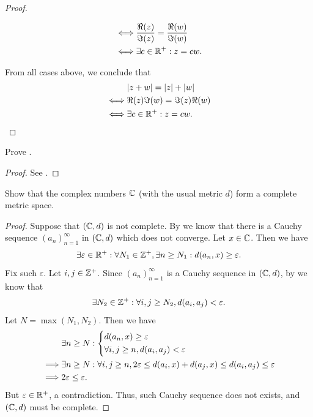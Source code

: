 \begin{proof}
\begin{itemize}
\begin{align*}
            \iff & \dfrac{\Re(z)}{\Im(z)} = \dfrac{\Re(w)}{\Im(w)} \\
            \iff & \exists c \in \mathbb{R}^+ : z = cw.
          \end{align*}
  \end{itemize}
  From all cases above, we conclude that
  \begin{align*}
         & \abs{z + w} = \abs{z} + \abs{w} \\
    \iff & \Re(z) \Im(w) = \Im(z) \Re(w)   \\
    \iff & \exists c \in \R^+ : z = cw.
  \end{align*}
\end{proof}

\begin{ex}\label{ii:ex:4.6.9}
  Prove .
\end{ex}

\begin{proof}
  See .
\end{proof}

\begin{ex}\label{ii:ex:4.6.10}
  Show that the complex numbers \(\mathbb{C}\) (with the usual metric \(d\)) form a complete metric space.
\end{ex}

\begin{proof}
  Suppose that \((\mathbb{C}, d)\) is not complete.
  By  we know that there is a Cauchy sequence \((a_n)_{n = 1}^\infty\) in \((\mathbb{C}, d)\) which does not converge.
  Let \(x \in \mathbb{C}\).
  Then we have
  \[
    \exists \varepsilon \in \mathbb{R}^+ : \forall N_1 \in \mathbb{Z}^+, \exists n \geq N_1 : d(a_n, x) \geq \varepsilon.
  \]
  Fix such \(\varepsilon\).
  Let \(i, j \in \mathbb{Z}^+\).
  Since \((a_n)_{n = 1}^\infty\) is a Cauchy sequence in \((\mathbb{C}, d)\), by  we know that
  \[
    \exists N_2 \in \mathbb{Z}^+ : \forall i, j \geq N_2, d(a_i, a_j) < \varepsilon.
  \]
  Let \(N = \max(N_1, N_2)\).
  Then we have
  \begin{align*}
             & \exists n \geq N : \begin{dcases}
                                    d(a_n, x) \geq \varepsilon \\
                                    \forall i, j \geq n, d(a_i, a_j) < \varepsilon
                                  \end{dcases}                                                  \\
    \implies & \exists n \geq N : \forall i, j \geq n, 2\varepsilon \leq d(a_i, x) + d(a_j, x) \leq d(a_i, a_j) \leq \varepsilon \\
    \implies & 2\varepsilon \leq \varepsilon.
  \end{align*}
  But \(\varepsilon \in \mathbb{R}^+\), a contradiction.
  Thus, such Cauchy sequence does not exists, and \((\mathbb{C}, d)\) must be complete.
\end{proof}

